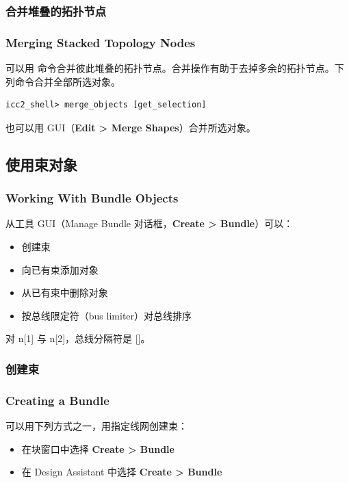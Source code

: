 \subsubsection{合并堆叠的拓扑节点}
\subsubsection*{Merging Stacked Topology Nodes}

可以用  命令合并彼此堆叠的拓扑节点。合并操作有助于去掉多余的拓扑节点。下列命令合并全部所选对象。
\begin{lstlisting}
icc2_shell> merge_objects [get_selection]
\end{lstlisting}

也可以用 GUI（\textbf{Edit > Merge Shapes}）合并所选对象。

\subsection{使用束对象}
\subsubsection*{Working With Bundle Objects}

从工具 GUI（Manage Bundle 对话框，\textbf{Create > Bundle}）可以：
\begin{itemize}
  \item 创建束
  \item 向已有束添加对象
  \item 从已有束中删除对象
  \item 按总线限定符（bus limiter）对总线排序
\end{itemize}

对 n[1] 与 n[2]，总线分隔符是 []。

\subsubsection{创建束}
\subsubsection*{Creating a Bundle}

可以用下列方式之一，用指定线网创建束：
\begin{itemize}
  \item 在块窗口中选择 \textbf{Create > Bundle}
  \item 在 Design Assistant 中选择 \textbf{Create > Bundle}
\end{itemize}

